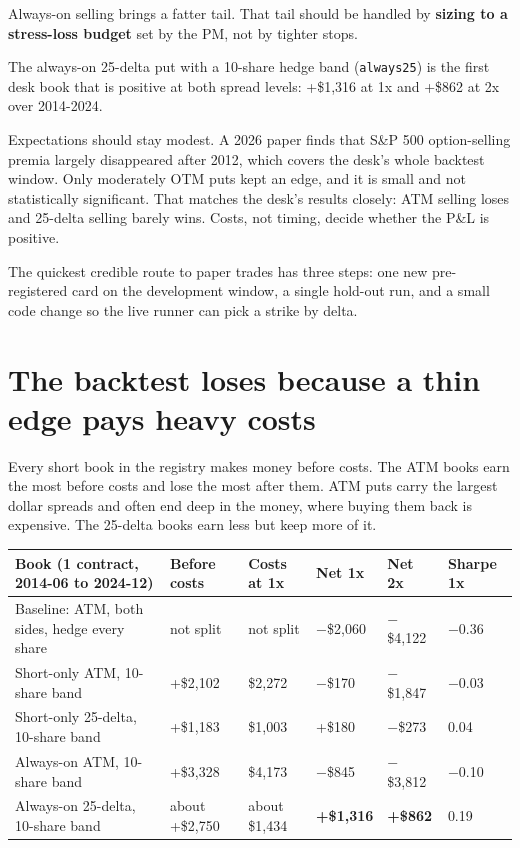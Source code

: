 \documentclass{article}
\begin{document}
Always-on selling brings a fatter tail. That tail should be handled by \textbf{sizing to a stress-loss budget} set by the PM, not by tighter stops.

The always-on 25-delta put with a 10-share hedge band (\texttt{always25}) is the first desk book that is positive at both spread levels: +\$1,316 at 1x and +\$862 at 2x over 2014-2024.

Expectations should stay modest. A 2026 paper finds that S\&P 500 option-selling premia largely disappeared after 2012, which covers the desk's whole backtest window. Only moderately OTM puts kept an edge, and it is small and not statistically significant. That matches the desk's results closely: ATM selling loses and 25-delta selling barely wins. Costs, not timing, decide whether the P\&L is positive.

The quickest credible route to paper trades has three steps: one new pre-registered card on the development window, a single hold-out run, and a small code change so the live runner can pick a strike by delta.

\section{The backtest loses because a thin edge pays heavy costs}

Every short book in the registry makes money before costs. The ATM books earn the most before costs and lose the most after them. ATM puts carry the largest dollar spreads and often end deep in the money, where buying them back is expensive. The 25-delta books earn less but keep more of it.

\begin{center}\small
\begin{tabularx}{\linewidth}{>{\raggedright\arraybackslash}X >{\raggedright\arraybackslash}X l l l l}
\toprule
\textbf{Book (1 contract, 2014-06 to 2024-12)} & \textbf{Before costs} & \textbf{Costs at 1x} & \textbf{Net 1x} & \textbf{Net 2x} & \textbf{Sharpe 1x} \\
\midrule
Baseline: ATM, both sides, hedge every share & not split & not split & \ensuremath{-}\$2,060 & \ensuremath{-}\$4,122 & \ensuremath{-}0.36 \\
Short-only ATM, 10-share band & +\$2,102 & \$2,272 & \ensuremath{-}\$170 & \ensuremath{-}\$1,847 & \ensuremath{-}0.03 \\
Short-only 25-delta, 10-share band & +\$1,183 & \$1,003 & +\$180 & \ensuremath{-}\$273 & 0.04 \\
Always-on ATM, 10-share band & +\$3,328 & \$4,173 & \ensuremath{-}\$845 & \ensuremath{-}\$3,812 & \ensuremath{-}0.10 \\
Always-on 25-delta, 10-share band & about +\$2,750 & about \$1,434 & \textbf{+\$1,316} & \textbf{+\$862} & 0.19 \\
\bottomrule
\end{tabularx}
\end{center}
\end{document}
